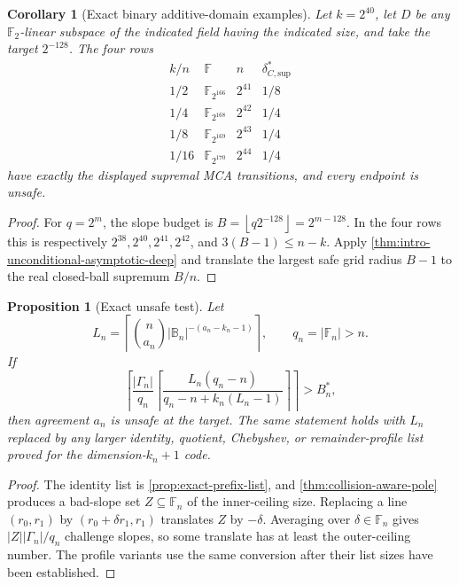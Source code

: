 \documentclass[11pt,a4paper]{amsart}
\numberwithin{equation}{section}
\newtheorem{proposition}[proposition]{Proposition}
\newtheorem{corollary}[corollary]{Corollary}
\theoremstyle{remark}
\newcommand{\F}{\mathbb F}
\newcommand{\B}{\mathbb B}
\newcommand{\abs}[1]{\lvert #1\rvert}
\newcommand{\floor}[1]{\left\lfloor #1\right\rfloor}
\begin{document}
\begin{corollary}[Exact binary additive-domain examples]
\label{cor:binary-additive-examples}
Let \(k=2^{40}\), let \(D\) be any \(\F_2\)-linear subspace of the
indicated field having the indicated size, and take the target
\(2^{-128}\).  The four rows
\[
\begin{array}{c|c|c|c}
 k/n&\F&n&\delta_{C,\mathrm{sup}}^*\\ \hline
 1/2&\F_{2^{166}}&2^{41}&1/8\\
 1/4&\F_{2^{168}}&2^{42}&1/4\\
 1/8&\F_{2^{169}}&2^{43}&1/4\\
 1/16&\F_{2^{170}}&2^{44}&1/4
\end{array}
\]
have exactly the displayed supremal MCA transitions, and every endpoint
is unsafe.
\end{corollary}

\begin{proof}
For \(q=2^m\), the slope budget is
\(B=\floor{q2^{-128}}=2^{m-128}\).  In the four rows this is respectively
\(2^{38},2^{40},2^{41},2^{42}\), and
\(3(B-1)\le n-k\).  Apply
\cref{thm:intro-unconditional-asymptotic-deep} and translate the largest
safe grid radius \(B-1\) to the real closed-ball supremum \(B/n\).
\end{proof}

\begin{proposition}[Exact unsafe test]\label{prop:simple-pole-lower}
Let
\[
 L_n=\left\lceil
 \binom n{a_n}\abs{\B_n}^{-(a_n-k_n-1)}
 \right\rceil,
 \qquad q_n=\abs{\F_n}>n.
\]
If
\[
 \left\lceil \frac{\abs{\Gamma_n}}{q_n}
 \left\lceil
 \frac{L_n(q_n-n)}{q_n-n+k_n(L_n-1)}
 \right\rceil\right\rceil>B_n^*,
 \tag{13.3}\label{eq:exact-unsafe-budget}
\]
then agreement \(a_n\) is unsafe at the target.  The same statement holds
with \(L_n\) replaced by any larger identity, quotient, Chebyshev, or
remainder-profile list proved for the dimension-\(k_n+1\) code.
\end{proposition}

\begin{proof}
The identity list is \cref{prop:exact-prefix-list}, and
\cref{thm:collision-aware-pole} produces a bad-slope set \(Z\subseteq\F_n\)
of the inner-ceiling size.  Replacing a line \((r_0,r_1)\) by
\((r_0+\delta r_1,r_1)\) translates \(Z\) by \(-\delta\).  Averaging over
\(\delta\in\F_n\) gives \(\abs Z\abs{\Gamma_n}/q_n\) challenge slopes, so
some translate has at least the outer-ceiling number.  The profile variants
use the same conversion after their list sizes have been established.
\end{proof}
\end{document}
